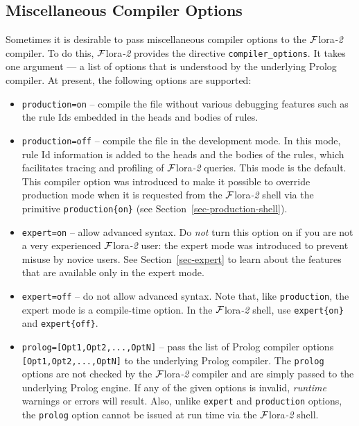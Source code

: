 \documentclass[11pt]{article}
\newcommand{\FLORA}{{\mbox{\sc ${\cal F}${lora}\rm\emph{-2}}}\xspace}
\newcommand{\FLSYSTEM}{\FLORA}
\begin{document}
\subsection{Miscellaneous Compiler Options}\label{misc-options}

Sometimes it is desirable to pass miscellaneous 
compiler options to the \FLSYSTEM
compiler. To do this, \FLSYSTEM provides the directive
{\tt compiler\_options}. It takes one argument --- a list of
options that is understood by the underlying Prolog compiler. At present,
the following options are supported:
\begin{itemize}
\item  \texttt{production=on} -- compile the file without various
  debugging features such as the rule Ids embedded in the heads and bodies
  of rules.
\item \texttt{production=off} -- compile the file in the development
  mode. In this mode, rule Id information is added to the heads and the
  bodies of the rules, which facilitates tracing and profiling of \FLSYSTEM
  queries. This mode is the default. This compiler option was introduced to
  make it possible to override production mode when it is
  requested from the \FLSYSTEM shell via the primitive
  \texttt{production\{on\}} (see Section~\ref{sec-production-shell}).
\item \texttt{expert=on} -- allow advanced syntax. 
  Do \emph{not} turn this option on if you are not a very
  experienced \FLSYSTEM user:
  the expert mode was introduced to prevent misuse by novice users.
  See Section~\ref{sec-expert} to learn about the features that are
  available only in the expert mode.
\item \texttt{expert=off} -- do not allow advanced syntax. Note that,
  like \texttt{production}, the expert mode is a compile-time option.
  In the \FLSYSTEM shell, use \texttt{expert\{on\}} and
  \texttt{expert\{off\}}.
\item \texttt{prolog=[Opt1,Opt2,...,OptN]} -- pass the list of Prolog
  compiler options \texttt{[Opt1,Opt2,...,OptN]} to the underlying Prolog
  compiler.  The \texttt{prolog} options are not checked by the \FLSYSTEM
  compiler and are simply passed to the underlying Prolog engine. If any of
  the given options is invalid, \emph{runtime} warnings or errors will result.
  Also, unlike \texttt{expert} and \texttt{production} options, the
  \texttt{prolog} option cannot be issued at run time via the \FLSYSTEM
  shell.
\end{itemize}
\end{document}
